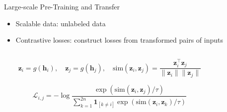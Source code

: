 \begin{frame}{Large-scale Pre-Training and Transfer}
\protect\hypertarget{large-scale-pre-training-and-transfer-7}{}
\begin{itemize}
\tightlist
\item
  Scalable data: unlabeled data
\item
  Contrastive losses: construct losses from transformed pairs of inputs
\end{itemize}

\begin{columns}[T]
\begin{column}{0.5\textwidth}
\small

\[
\mathbf{z}_i = g(\mathbf{h}_i),\quad
\mathbf{z}_j = g(\mathbf{h}_j),\quad
\text{sim}(\mathbf{z}_i, \mathbf{z}_j) = \frac{\mathbf{z}_i^\top\mathbf{z}_j}{\|\mathbf{z}_i\| \|\mathbf{z}_j\|}
\]

\vspace*{-0.2cm}

\[
\mathcal{L}_{i,j} = - \log\frac{\exp(\text{sim}(\mathbf{z}_i, \mathbf{z}_j) / \tau)}{\sum_{k=1}^{2n} \mathbf{1}_{[k \neq i]} \exp(\text{sim}(\mathbf{z}_i, \mathbf{z}_k) / \tau)}
\]

\normalsize

\end{column}

\begin{column}{0.5\textwidth}
\end{column}
\end{columns}


\end{frame}
